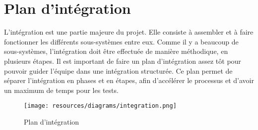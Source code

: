 \chapter{Plan d'intégration}

L'intégration est une partie majeure du projet. Elle consiste à assembler et à faire fonctionner les différents sous-systèmes entre eux. Comme il y a beaucoup de sous-systèmes, l'intégration doit être effectuée de manière méthodique, en plusieurs étapes. Il est important de faire un plan d'intégration assez tôt pour pouvoir guider l'équipe dans une intégration structurée. Ce plan permet de séparer l'intégration en phases et en étapes, afin d'accélérer le processus et d'avoir un maximum de temps pour les tests.

\begin{landscape}
\begin{figure}
  \centering
  \texttt{[image: resources/diagrams/integration.png]}
  \caption{Plan d'intégration}
\end{figure}
\end{landscape}

